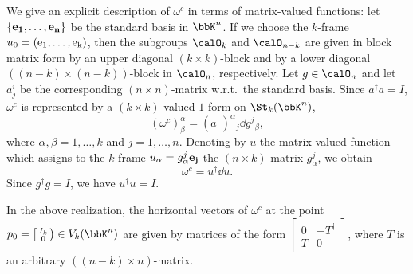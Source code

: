 \begin{example}
    We give an explicit description of $\omega^c$ in terms of matrix-valued functions: let $\{\bf{e}_1,\ldots,\bf{e}_n\}$ be the standard basis in $\bbK^n$. If we choose the $k$-frame $u_0=(\rm{e}_1,\ldots,\rm{e}_k)$, then the subgroups $\calO_k$ and $\calO_{n-k}$ are given in block matrix form by an upper diagonal $(k\times k)$-block and by a lower diagonal $((n-k)\times(n-k))$-block in $\calO_n$, respectively. Let $g\in\calO_n$ and let $a^i_j$ be the corresponding $(n\times n)$-matrix w.r.t.\ the standard basis. Since $a^\dagger a=I$, $\omega^c$ is represented by a $(k\times k)$-valued $1$-form on $\St_k(\bbK^n)$,
    \[(\omega^c)^\alpha_\beta=(a^\dagger)^\alpha{}_j \dd g^j{}_\beta,\]
    where $\alpha,\beta=1,\ldots,k$ and $j=1,\ldots,n$. Denoting by $u$ the matrix-valued function which assigns to the $k$-frame $u_\alpha=g^j_\alpha \bf{e}_j$ the $(n\times k)$-matrix $g^j_\alpha$, we obtain
    \[\omega^c=u^\dagger\dd u.\]
    Since $g^\dagger g=I$, we have $u^\dagger u=I$.
\end{example}

\begin{rem}
    In the above realization, the horizontal vectors of $\omega^c$ at the point $p_0=\left[\begin{smallmatrix}
        I_k\\0
    \end{smallmatrix}\right)\in V_k(\bbK^n)$
    are given by matrices of the form $\left[\begin{smallmatrix}
        0&-T^\dagger\\
        T&0
    \end{smallmatrix}\right]$,
    where $T$ is an arbitrary $((n-k)\times n)$-matrix.
\end{rem}

